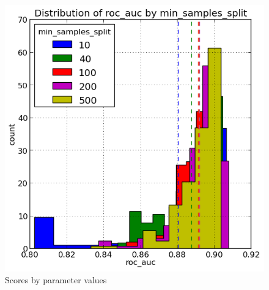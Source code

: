 \documentclass[final,3p,times,twocolumn]{elsarticle}
\begin{document}
\begin{figure}
\includegraphics[scale=0.5]{Images/roc_auc_min_samples_split.png}
\caption{Scores by parameter values}
\label{param_iterate_roc}
\end{figure}
\end{document}
